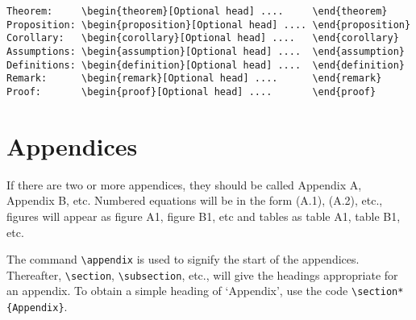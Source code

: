\documentclass{OUP-EJ}
\begin{document}
\begin{itemize}
\begin{verbatim}
Theorem:     \begin{theorem}[Optional head] ....     \end{theorem}
Proposition: \begin{proposition}[Optional head] .... \end{proposition}
Corollary:   \begin{corollary}[Optional head] ....   \end{corollary}
Assumptions: \begin{assumption}[Optional head] ....  \end{assumption}
Definitions: \begin{definition}[Optional head] ....  \end{definition}
Remark:      \begin{remark}[Optional head] ....      \end{remark}
Proof:       \begin{proof}[Optional head] ....       \end{proof}
\end{verbatim}



\end{itemize}


\section{Appendices}
If there are two or more appendices, they should be called Appendix A, Appendix B, etc.
Numbered equations will be in the form (A.1), (A.2), etc.,
figures will appear as figure A1, figure B1, etc and tables as table A1,
table B1, etc.

The command \verb"\appendix" is used to signify the start of the
appendices. Thereafter, \verb"\section", \verb"\subsection", etc., will
give the headings appropriate for an appendix. To obtain a simple heading of
`Appendix', use the code \verb"\section*{Appendix}".
\end{document}
